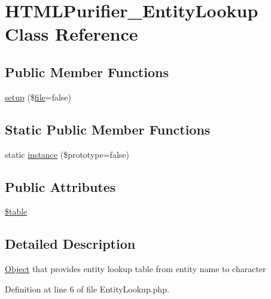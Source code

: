 \hypertarget{classHTMLPurifier__EntityLookup}{\section{H\+T\+M\+L\+Purifier\+\_\+\+Entity\+Lookup Class Reference}
\label{classHTMLPurifier__EntityLookup}
}
\subsection*{Public Member Functions}
\begin{DoxyCompactItemize}
\item 
\hyperlink{classHTMLPurifier__EntityLookup_aae496d135747271eb51684fcce32c7c2}{setup} (\$\hyperlink{classfile}{file}=false)
\end{DoxyCompactItemize}
\subsection*{Static Public Member Functions}
\begin{DoxyCompactItemize}
\item 
static \hyperlink{classHTMLPurifier__EntityLookup_a1d716a608ccda0fec25d9f78b9678f49}{instance} (\$prototype=false)
\end{DoxyCompactItemize}
\subsection*{Public Attributes}
\begin{DoxyCompactItemize}
\item 
\hyperlink{classHTMLPurifier__EntityLookup_a821c8d947878cf667426a6aa809d605c}{\$table}
\end{DoxyCompactItemize}


\subsection{Detailed Description}
\hyperlink{classObject}{Object} that provides entity lookup table from entity name to character 

Definition at line 6 of file Entity\+Lookup.\+php.



